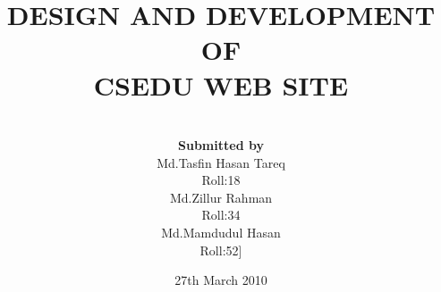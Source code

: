 \documentclass[12pt,a4paper,oneside]{article}
\begin{document}
\title  {DESIGN AND DEVELOPMENT OF\\ CSEDU  WEB  SITE}
 

\author{\\{\bf Submitted by}\\Md.Tasfin Hasan Tareq\\\bigskip Roll:18\\Md.Zillur Rahman\\\bigskip Roll:34\\ Md.Mamdudul Hasan\\Roll:52]}

\date{27th March 2010}
\maketitle
 


 
 
\end{document}

